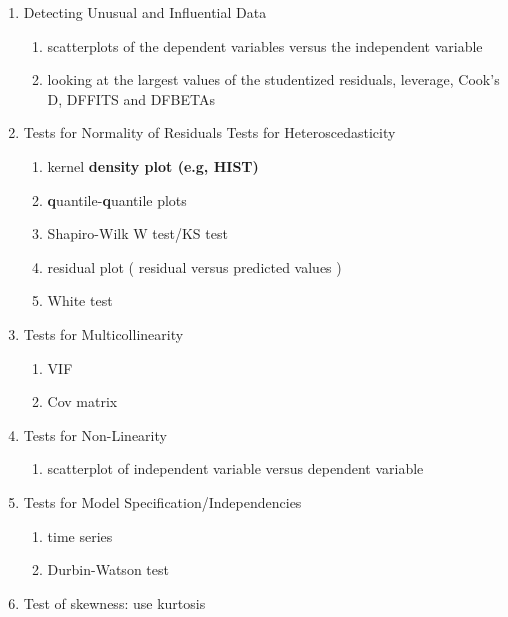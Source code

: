 \begin{enumerate}
	\def\labelenumi{\arabic{enumi}.}
	\item
	Detecting Unusual and Influential Data
	
	\begin{enumerate}
		\def\labelenumii{\alph{enumii}.}
		\item
		scatterplots of the dependent variables versus the independent
		variable
		\item
		looking at the largest values of the studentized residuals,
		leverage, Cook's D, DFFITS and DFBETAs
	\end{enumerate}
	\item
	Tests for Normality of Residuals Tests for Heteroscedasticity
	
	\begin{enumerate}
		\def\labelenumii{\alph{enumii}.}
		\item
		kernel \textbf{density plot (e.g, HIST)}
		\item
		\textbf{q}uantile-\textbf{q}uantile plots
		\item
		Shapiro-Wilk W test/KS test
		\item
		residual plot ( residual versus predicted values )
		\item
		White test
	\end{enumerate}
	\item
	Tests for Multicollinearity
	
	\begin{enumerate}
		\def\labelenumii{\alph{enumii}.}
		\item
		VIF
		\item
		Cov matrix
	\end{enumerate}
	\item
	Tests for Non-Linearity
	
	\begin{enumerate}
		\def\labelenumii{\alph{enumii}.}
		\item
		scatterplot of independent variable versus dependent variable
	\end{enumerate}
	\item
	Tests for Model Specification/Independencies
	
	\begin{enumerate}
		\def\labelenumii{\alph{enumii}.}
		\item
		time series
		\item
		Durbin-Watson test
	\end{enumerate}
	\item
	Test of skewness: use kurtosis
\end{enumerate}

